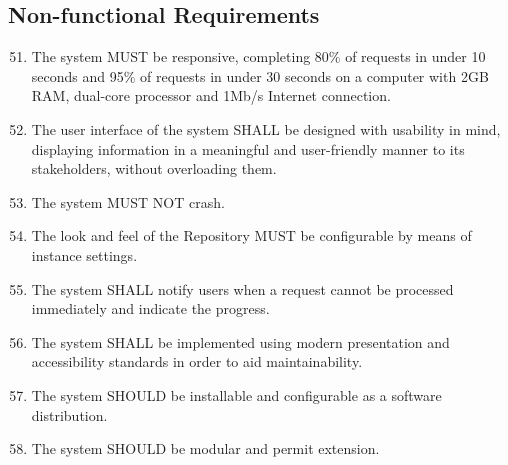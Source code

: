 \subsection{Non-functional Requirements}
\label{nonFunctionalRequirements}
\begin{enumerate}[1]
\setcounter{enumi}{50}
\item The system MUST be responsive, completing 80\% of requests in under 10 seconds and 95\% of requests in under 30 seconds on a computer with 2GB RAM, dual-core processor and 1Mb/s Internet connection.

\item The user interface of the system  SHALL be designed with usability in mind, displaying information in a meaningful and user-friendly manner to its stakeholders, without overloading them.

\item The system MUST NOT crash.

\item The look and feel of the Repository MUST be configurable by means of instance settings.

\item The system SHALL notify users when a request cannot be processed immediately and indicate the progress.

\item The system SHALL be implemented using modern presentation and accessibility standards in order to aid maintainability.

\item The system SHOULD be installable and configurable as a software distribution.

\item The system SHOULD be modular and permit extension.
\end{enumerate}
